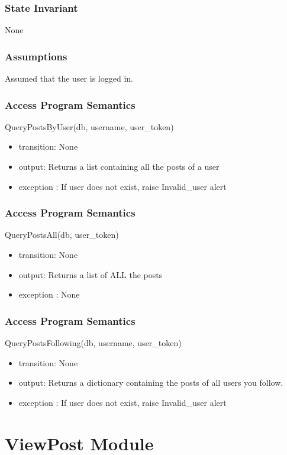 \documentclass[12pt, titlepage]{article}
\begin{document}
\subsubsection{State Invariant}
None

\subsubsection{Assumptions}
Assumed that the user is logged in.

\subsubsection{Access Program Semantics}
QueryPostsByUser(db, username, user\_token)
\begin{itemize}
    \item transition: None
    \item output: Returns a list containing all the posts of a user
    \item exception : If user does not exist, raise Invalid\_user alert
\end{itemize}


\subsubsection{Access Program Semantics}
QueryPostsAll(db, user\_token)
\begin{itemize}
    \item transition: None
    \item output: Returns a list of ALL the posts
    \item exception : None
\end{itemize}


\subsubsection{Access Program Semantics}
QueryPostsFollowing(db, username, user\_token)
\begin{itemize}
    \item transition: None
    \item output: Returns a dictionary containing the posts of all users you follow.
    \item exception : If user does not exist, raise Invalid\_user alert
\end{itemize}






\section* {ViewPost Module}
\end{document}
